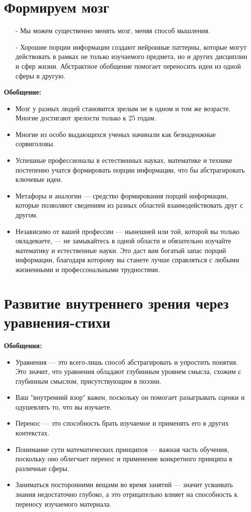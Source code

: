 \documentclass{article}
\begin{document}
\section{Формируем мозг}
\begin{itemize}
\item[-] Мы можем существенно менять мозг, меняя способ мышления.
\item[-] Хорошие порции информации создают нейронные паттерны, которые могут действовать в рамках не только изучаемого предмета, но и других дисциплин и сфер жизни. Абстрактное обобщение помогает переносить идеи из одной сферы в другую.
\end{itemize}
\textbf{Обобщение:}
\begin{itemize}
\item Мозг у разных людей становится зрелым не в одном и том же возрасте. Многие достигают зрелости только к 25 годам.
\item Многие из особо выдающихся ученых начинали как безнаденжные сорвиголовы.
\item Успешные профессионалы в естественных науках, математике и технике постепенно учатся формировать порции информации, что бы абстрагировать ключевые идеи.
\item Метафоры и аналогии --- средство формирования порций информации, которые позволяют сведениям из разных областей взаимодействовать друг с другом.
\item Независимо от вашей профессии --- нынешней или той, которой вы только овладеваете, --- не замыкайтесь в одной области и обязательно изучайте математику и естественные науки. Это даст вам богатый запас порций информации, благодаря которому вы станете лучше справляться с любыми жизненными и профессональными трудностями.
\end{itemize}

\section{Развитие внутреннего зрения через уравнения-стихи}
\textbf{Обобщения:}
\begin{itemize}
\item Уравнения --- это всего-лишь способ абстрагировать и упростить понятия. Это значит, что уравнения обладают глубинным уровнем смысла, схожим с глубинным смыслом, присутствующим в поэзии.
\item Ваш "внутренний взор" важен, поскольку он помогает разыгрывать сценки и одушевлять то, что вы изучаете.
\item Перенос --- это способность брать изучаемое и применять его в других контекстах.
\item Понимание сути математических принципов --- важная часть обучения, поскольку оно облегчает перенос и применение конкретного принципа в различные сферы.
\item Заниматься посторонними вещами во время занятий --- значит усваивать знания недостаточно глубоко, а это отрицательно влияет на способность к переносу изучаемого материала.
\end{itemize}
\end{document}
